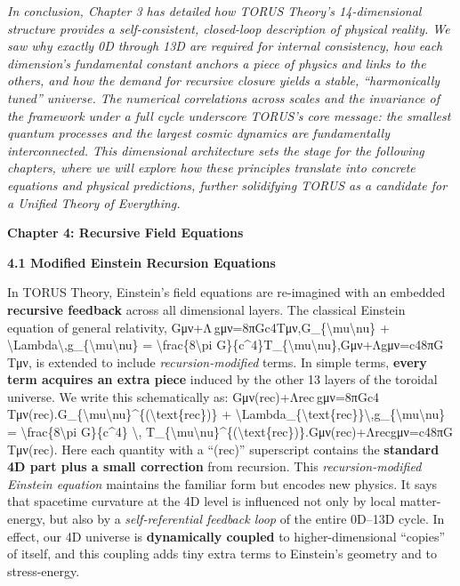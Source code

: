 \emph{In conclusion, Chapter 3 has detailed how TORUS Theory's
14-dimensional structure provides a self-consistent, closed-loop
description of physical reality. We saw why exactly 0D through 13D are
required for internal consistency, how each dimension's fundamental
constant anchors a piece of physics and links to the others, and how the
demand for recursive closure yields a stable, ``harmonically tuned''
universe. The numerical correlations across scales and the invariance of
the framework under a full cycle underscore TORUS's core message: the
smallest quantum processes and the largest cosmic dynamics are
fundamentally interconnected. This dimensional architecture sets the
stage for the following chapters, where we will explore how these
principles translate into concrete equations and physical predictions,
further solidifying TORUS as a candidate for a Unified Theory of
Everything.}

\textbf{Chapter 4: Recursive Field Equations}

\textbf{4.1 Modified Einstein Recursion Equations}

In TORUS Theory, Einstein's field equations are re-imagined with an
embedded \textbf{recursive feedback} across all dimensional layers. The
classical Einstein equation of general relativity,
Gμν+Λ gμν=8πGc4Tμν,G\_\{\textbackslash{}mu\textbackslash{}nu\} +
\textbackslash{}Lambda\textbackslash{},g\_\{\textbackslash{}mu\textbackslash{}nu\}
= \textbackslash{}frac\{8\textbackslash{}pi
G\}\{c\^{}4\}T\_\{\textbackslash{}mu\textbackslash{}nu\},Gμν​+Λgμν​=c48πG​Tμν​,
is extended to include \emph{recursion-modified} terms. In simple terms,
\textbf{every term acquires an extra piece} induced by the other 13
layers of the toroidal universe. We write this schematically as:
Gμν(rec)+Λrec gμν=8πGc4 Tμν(rec).G\_\{\textbackslash{}mu\textbackslash{}nu\}\^{}\{(\textbackslash{}text\{rec\})\}
+
\textbackslash{}Lambda\_\{\textbackslash{}text\{rec\}\}\textbackslash{},g\_\{\textbackslash{}mu\textbackslash{}nu\}
= \textbackslash{}frac\{8\textbackslash{}pi G\}\{c\^{}4\}
\textbackslash{},
T\_\{\textbackslash{}mu\textbackslash{}nu\}\^{}\{(\textbackslash{}text\{rec\})\}.Gμν(rec)​+Λrec​gμν​=c48πG​Tμν(rec)​.
Here each quantity with a ``(rec)'' superscript contains the
\textbf{standard 4D part plus a small correction} from recursion. This
\emph{recursion-modified Einstein equation} maintains the familiar form
but encodes new physics. It says that spacetime curvature at the 4D
level is influenced not only by local matter-energy, but also by a
\emph{self-referential feedback loop} of the entire 0D--13D cycle​. In
effect, our 4D universe is \textbf{dynamically coupled} to
higher-dimensional ``copies'' of itself, and this coupling adds tiny
extra terms to Einstein's geometry and to stress-energy.

